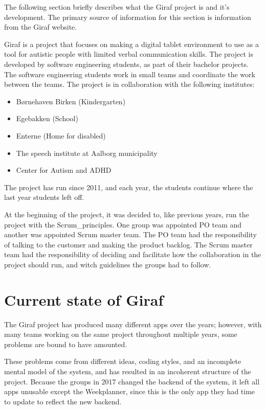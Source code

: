 
The following section briefly describes what the Giraf project is and it's development. The primary source of information for this section is information from the Giraf website\cite{GirafWebsite}.


Giraf is a project that focuses on making a digital tablet environment to use as a tool for autistic people with limited verbal communication skills. The project is developed by software engineering students, as part of their bachelor projects.  The software engineering students work in small teams and coordinate the work between the teams. The project is in collaboration with the following institutes:

\begin{itemize}
    \item Børnehaven Birken (Kindergarten) \cite{bhBirken}
    \item Egebakken (School) \cite{egebakken}
    \item Enterne (Home for disabled) \cite{enterne}
    \item The speech institute at Aalborg municipality %
    \item Center for Autism and ADHD \cite{center_for_autism}
\end{itemize}
The project has run since 2011, and each year, the students continue where the last year students left off.

At the beginning of the project, it was decided to, like previous years, run the project with the \gls{Scrum_principles}. One group was appointed \gls{PO} team and another was appointed Scrum master team. The \gls{PO} team had the responsibility of talking to the customer and making the product backlog. The Scrum master team had the responsibility of deciding and facilitate how the collaboration in the project should run, and witch guidelines the groups had to follow.

\section{Current state of Giraf}

The Giraf project has produced many different apps over the years; however, with many teams working on the same project throughout multiple years, some problems are bound to have amounted.

These problems come from different ideas, coding styles, and an incomplete mental model of the system, and has resulted in an incoherent structure of the project. Because the groups in 2017 \cite{SW608F18} changed the backend of the system, it left all apps unusable except the Weekplanner, since this is the only app they had time to update to reflect the new backend.

